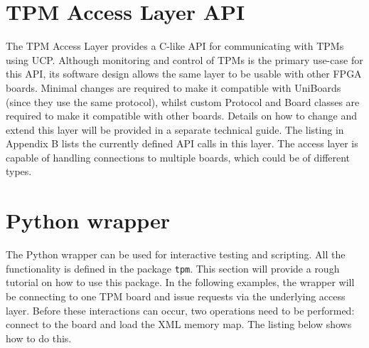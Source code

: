 \documentclass[a4paper,11pt]{article}
\begin{document}
\section{TPM Access Layer API}
\label{TPMAPI}

The TPM Access Layer provides a C-like API for communicating with TPMs using 
UCP. Although monitoring and control of TPMs is the primary use-case for this 
API, its software design allows the same layer to be usable with other FPGA 
boards. Minimal changes are required to make it compatible with UniBoards 
(since they use the same protocol), whilst custom Protocol and Board classes 
are required to make it compatible with other boards. Details on how to change 
and extend this layer will be provided in a separate technical guide. The 
listing in Appendix B lists the currently defined API calls in this layer. The 
access layer is capable of handling connections to multiple boards, which could 
be of different types. 


\section{Python wrapper}
\label{Python}

The Python wrapper can be used for interactive testing and scripting. All the 
functionality is defined in the package \texttt{tpm}. This section will provide 
a rough tutorial on how to use this package. In the following examples, 
the wrapper will be connecting to one TPM board and issue requests via the 
underlying access layer. Before these interactions can occur, two operations 
need to be performed: connect to the board and load the XML memory map. The 
listing below shows how to do this.

\end{document}
